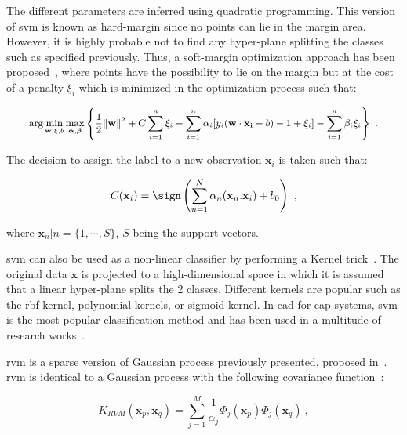 The different parameters are inferred using quadratic programming.
This version of \ac{svm} is known as hard-margin since no points can lie in the margin area.
However, it is highly probable not to find any hyper-plane splitting the classes such as specified previously.
Thus, a soft-margin optimization approach has been proposed~\cite{Cortes1995}, where points have the possibility to lie on the margin but at the cost of a penalty $\xi_i$ which is minimized in the optimization process such that:

\begin{equation}
\small
\arg\min_{\mathbf{w},\mathbf{\xi}, b } \max_{\boldsymbol{\alpha},\boldsymbol{\beta} } \left\{ \frac{1}{2}\|\mathbf{w}\|^2+C \sum_{i=1}^n \xi_i - \sum_{i=1}^{n}{\alpha_i[y_i(\mathbf{w}\cdot \mathbf{x_i} - b) -1 + \xi_i]} - \sum_{i=1}^{n} \beta_i \xi_i \right\} \ .
\end{equation}

The decision to assign the label to a new observation $\mathbf{x}_i$ is taken such that:

\begin{equation}
	C(\mathbf{x}_i) = \sign \left( \sum_{n=1}^{N} \alpha_n (\mathbf{x}_n . \mathbf{x}_i) + b_0 \right) \ ,
	\label{eq:svmdec} 
\end{equation}

\noindent where $\mathbf{x}_n|n=\{1,\cdots,S\}$, $S$ being the support vectors.

\ac{svm} can also be used as a non-linear classifier by performing a Kernel trick~\cite{Boser1992}.
The original data $\mathbf{x}$ is projected to a high-dimensional space in which it is assumed that a linear hyper-plane splits the 2 classes.
Different kernels are popular such as the \ac{rbf} kernel, polynomial kernels, or sigmoid kernel.
In \ac{cad} for \ac{cap} systems, \ac{svm} is the most popular classification method and has been used in a multitude of research works~\cite{Artan2009,Artan2010,Chan2003,Litjens2011,Litjens2012,Liu2013,Lopes2011,Niaf2011,Niaf2012,Ozer2009,Ozer2010,Parfait2012,Peng2013,Sung2011,Tiwari2012,Vos2008,Vos2008a,Vos2010,Vos2012,giannini2015fully,trigui2017automatic,lehaire2014computer,khalvati2015automated,chung2015prostate}.

\Acf{rvm} is a sparse version of Gaussian process previously presented, proposed in~\cite{Tipping2001}.
\ac{rvm} is identical to a Gaussian process with the following covariance function~\cite{Quinonero-Candela2002}:

\begin{equation}
	K_{RVM}(\mathbf{x}_p,\mathbf{x}_q) = \sum_{j=1}^{M} \frac{1}{\alpha_j} \Phi_j ( \mathbf{x}_p ) \Phi_j ( \mathbf{x}_q ) \ ,
 	\label{eq:rvm}
\end{equation}

